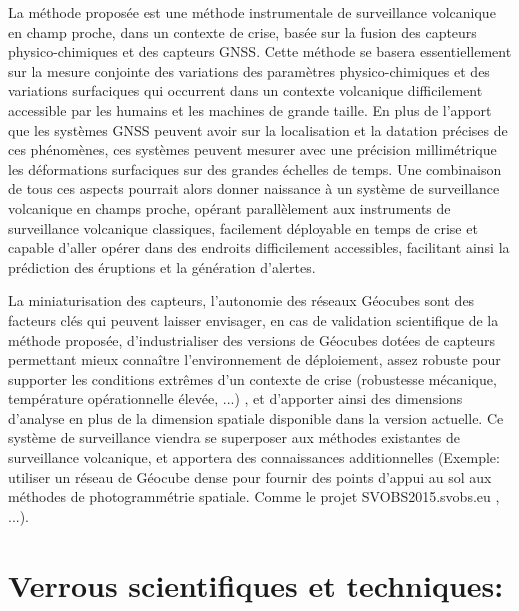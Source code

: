 \documentclass{themeensg}
\begin{document}
\begin{appendices}
La méthode proposée est une méthode instrumentale de surveillance volcanique en champ proche, dans un contexte de crise, basée sur la fusion des capteurs physico-chimiques et des capteurs GNSS. Cette méthode se basera essentiellement sur la mesure conjointe des variations des paramètres physico-chimiques et des variations surfaciques qui occurrent dans un contexte volcanique difficilement accessible par les humains et les machines de grande taille. En plus de l'apport que les systèmes GNSS peuvent avoir sur la localisation et la datation précises de ces phénomènes, ces systèmes peuvent mesurer avec une précision millimétrique les déformations surfaciques sur des grandes échelles de temps. Une combinaison de tous ces aspects pourrait alors donner naissance à un système de surveillance volcanique en champs proche, opérant parallèlement aux instruments de surveillance volcanique classiques, facilement déployable en temps de crise et capable d'aller opérer dans des endroits difficilement accessibles, facilitant ainsi la prédiction des éruptions et la génération d'alertes.

La miniaturisation des capteurs, l'autonomie des réseaux Géocubes sont des facteurs clés qui peuvent laisser envisager, en cas de validation scientifique de la méthode proposée, d'industrialiser des versions de Géocubes dotées de capteurs permettant mieux connaître l'environnement de déploiement, assez robuste pour supporter les conditions extrêmes d'un contexte de crise (robustesse mécanique, température opérationnelle élevée, ...) , et d'apporter ainsi des dimensions d'analyse en plus de la dimension spatiale disponible dans la version actuelle. Ce système de surveillance viendra se superposer aux méthodes existantes de surveillance volcanique, et apportera des connaissances additionnelles (Exemple: utiliser un réseau de Géocube dense pour fournir des points d'appui au sol aux méthodes de photogrammétrie spatiale. Comme le projet SVOBS2015.svobs.eu , ...).

\section*{Verrous scientifiques et techniques:}


\end{appendices}
\end{document}
